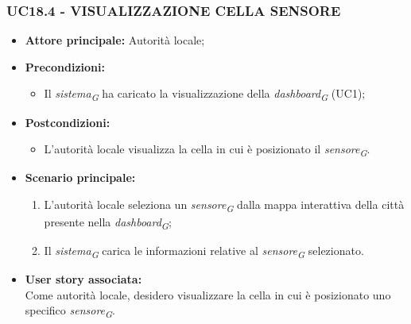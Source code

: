 \subsubsection{UC18.4 - VISUALIZZAZIONE CELLA SENSORE}
\begin{itemize}
    \item \textbf{Attore principale:} Autorità locale;
    \item \textbf{Precondizioni:}
        \begin{itemize}
            \item Il \textit{sistema}\textsubscript{\textit{G}} ha caricato la visualizzazione della \textit{dashboard}\textsubscript{\textit{G}} (UC1);
        \end{itemize}
    \item \textbf{Postcondizioni:}
        \begin{itemize}
            \item L'autorità locale visualizza la cella in cui è posizionato il \textit{sensore}\textsubscript{\textit{G}}.
        \end{itemize}
    \item \textbf{Scenario principale:}
        \begin{enumerate}
            \item L'autorità locale seleziona un \textit{sensore}\textsubscript{\textit{G}} dalla mappa interattiva della città presente nella \textit{dashboard}\textsubscript{\textit{G}};
            \item Il \textit{sistema}\textsubscript{\textit{G}} carica le informazioni relative al \textit{sensore}\textsubscript{\textit{G}} selezionato.
        \end{enumerate}
    \item \textbf{User story associata:} \\
        Come autorità locale, desidero visualizzare la cella in cui è posizionato uno specifico \textit{sensore}\textsubscript{\textit{G}}.
\end{itemize}